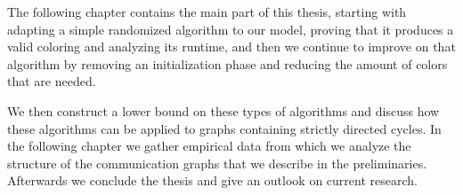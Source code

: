 The following chapter contains the main part of this thesis, starting with adapting a simple randomized algorithm to our model, proving that it produces a valid coloring and analyzing its runtime, and then we continue to improve on that algorithm by removing an initialization phase and reducing the amount of colors that are needed.

We then construct a lower bound on these types of algorithms and discuss how these algorithms can be applied to graphs containing strictly directed cycles. In the following chapter we gather empirical data from which we analyze the structure of the communication graphs that we describe in the preliminaries. Afterwards we conclude the thesis and give an outlook on current research.


